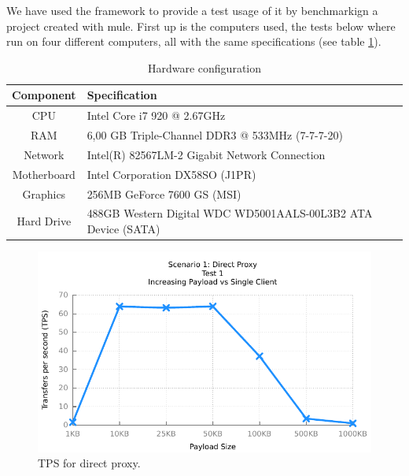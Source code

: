 
We have used the framework to provide a test usage of it by benchmarkign a project created with mule.
First up is the computers used, the tests below where run on four different computers, all with the same specifications (see table \ref{table:hw-spec}).

\begin{table}
	\caption{Hardware configuration}
	\label{table:hw-spec}
	\begin{tabular}{c l}
		Component & Specification \\ 
		\hline
		CPU & Intel Core i7 920 @ 2.67GHz  \\
		RAM &  6,00 GB Triple-Channel DDR3 @ 533MHz (7-7-7-20) \\
		Network &  Intel(R) 82567LM-2 Gigabit Network Connection \\
		Motherboard &  Intel Corporation DX58SO (J1PR) \\
		Graphics &  256MB GeForce 7600 GS (MSI) \\
		Hard Drive &  488GB Western Digital WDC WD5001AALS-00L3B2 ATA Device (SATA) \\
		\hline
	\end{tabular} 
\end{table}

\begin{figure}
	\centerline{\includegraphics{img/proxy_fu_ip_tps}}
	\caption{TPS for direct proxy.}
	\label{fig:proxy-1-1}
\end{figure}

